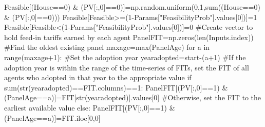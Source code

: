 \documentclass[
  letterpaper,
  DIV=11,
  numbers=noendperiod]{scrartcl}
\newenvironment{Shaded}{\begin{snugshade}}{\end{snugshade}}
\newcommand{\BuiltInTok}[1]{\textcolor[rgb]{0.00,0.23,0.31}{#1}}
\newcommand{\CommentTok}[1]{\textcolor[rgb]{0.37,0.37,0.37}{#1}}
\newcommand{\ControlFlowTok}[1]{\textcolor[rgb]{0.00,0.23,0.31}{#1}}
\newcommand{\DecValTok}[1]{\textcolor[rgb]{0.68,0.00,0.00}{#1}}
\newcommand{\KeywordTok}[1]{\textcolor[rgb]{0.00,0.23,0.31}{#1}}
\newcommand{\NormalTok}[1]{\textcolor[rgb]{0.00,0.23,0.31}{#1}}
\newcommand{\OperatorTok}[1]{\textcolor[rgb]{0.37,0.37,0.37}{#1}}
\newcommand{\StringTok}[1]{\textcolor[rgb]{0.13,0.47,0.30}{#1}}
\begin{document}
\begin{Shaded}
\begin{Highlighting}[]
\NormalTok{    Feasible[(House}\OperatorTok{==}\DecValTok{0}\NormalTok{) }\OperatorTok{\&}\NormalTok{ (PV[:,}\DecValTok{0}\NormalTok{]}\OperatorTok{==}\DecValTok{0}\NormalTok{)]}\OperatorTok{=}\NormalTok{np.random.uniform(}\DecValTok{0}\NormalTok{,}\DecValTok{1}\NormalTok{,}\BuiltInTok{sum}\NormalTok{((House}\OperatorTok{==}\DecValTok{0}\NormalTok{) }\OperatorTok{\&}\NormalTok{ (PV[:,}\DecValTok{0}\NormalTok{]}\OperatorTok{==}\DecValTok{0}\NormalTok{)))}
\NormalTok{    Feasible[Feasible}\OperatorTok{\textgreater{}=}\NormalTok{(}\DecValTok{1}\OperatorTok{{-}}\NormalTok{Params[}\StringTok{"FeasibilityProb"}\NormalTok{].values[}\DecValTok{0}\NormalTok{])]}\OperatorTok{=}\DecValTok{1}
\NormalTok{    Feasible[Feasible}\OperatorTok{\textless{}}\NormalTok{(}\DecValTok{1}\OperatorTok{{-}}\NormalTok{Params[}\StringTok{"FeasibilityProb"}\NormalTok{].values[}\DecValTok{0}\NormalTok{])]}\OperatorTok{=}\DecValTok{0}
    \CommentTok{\#Create vector to hold feed{-}in tariffs earned by each agent}
\NormalTok{    PanelFIT}\OperatorTok{=}\NormalTok{np.zeros(}\BuiltInTok{len}\NormalTok{(Inputs.index))}
    \CommentTok{\#Find the oldest existing panel}
\NormalTok{    maxage}\OperatorTok{=}\BuiltInTok{max}\NormalTok{(PanelAge)}
    \ControlFlowTok{for}\NormalTok{ a }\KeywordTok{in} \BuiltInTok{range}\NormalTok{(maxage}\OperatorTok{+}\DecValTok{1}\NormalTok{):}
        \CommentTok{\#Set the adoption year}
\NormalTok{        yearadopted}\OperatorTok{=}\NormalTok{start}\OperatorTok{{-}}\NormalTok{(a}\OperatorTok{+}\DecValTok{1}\NormalTok{)}
        \CommentTok{\#If the adoption year is within the range of the time{-}series of FITs, set the FIT of all agents who adopted in that year to the appropriate value}
        \ControlFlowTok{if} \BuiltInTok{sum}\NormalTok{(}\BuiltInTok{str}\NormalTok{(yearadopted)}\OperatorTok{==}\NormalTok{FIT.columns)}\OperatorTok{==}\DecValTok{1}\NormalTok{:}
\NormalTok{            PanelFIT[(PV[:,}\DecValTok{0}\NormalTok{]}\OperatorTok{==}\DecValTok{1}\NormalTok{) }\OperatorTok{\&}\NormalTok{ (PanelAge}\OperatorTok{==}\NormalTok{a)]}\OperatorTok{=}\NormalTok{FIT[}\BuiltInTok{str}\NormalTok{(yearadopted)].values[}\DecValTok{0}\NormalTok{]}
        \CommentTok{\#Otherwise, set the FIT to the earliest available value}
        \ControlFlowTok{else}\NormalTok{:}
\NormalTok{            PanelFIT[(PV[:,}\DecValTok{0}\NormalTok{]}\OperatorTok{==}\DecValTok{1}\NormalTok{) }\OperatorTok{\&}\NormalTok{ (PanelAge}\OperatorTok{==}\NormalTok{a)]}\OperatorTok{=}\NormalTok{FIT.iloc[}\DecValTok{0}\NormalTok{,}\DecValTok{0}\NormalTok{]}


\end{Highlighting}
\end{Shaded}
\end{document}
